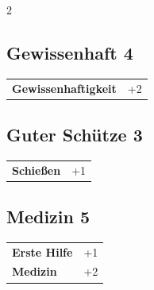 \begin{multicols}{2}
\begin{tcolorbox}

\end{tcolorbox}

\begin{tcolorbox}
    \subsection*{Gewissenhaft \hfill \small{4 }}
    \tcblower




\begin{tabular}{@{}ll@{}}
    \textbf{Gewissenhaftigkeit} & +2\\
\end{tabular}


\end{tcolorbox}

\begin{tcolorbox}
    \subsection*{Guter Schütze \hfill \small{3 }}
    \tcblower




\begin{tabular}{@{}ll@{}}
    \textbf{Schießen} & +1\\
\end{tabular}


\end{tcolorbox}

\begin{tcolorbox}
    \subsection*{Medizin \hfill \small{5 }}
    \tcblower




\begin{tabular}{@{}ll@{}}
    \textbf{Erste Hilfe} & +1\\
    \textbf{Medizin} & +2\\
\end{tabular}


\end{tcolorbox}
\end{multicols}
